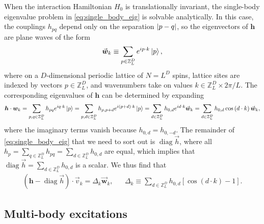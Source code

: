 \documentclass[nofootinbib,notitlepage,11pt]{revtex4-2}
\newcommand{\p}[1]{\left(#1\right)} %
\renewcommand{\sp}[1]{\left[#1\right]} %
\renewcommand{\c}{\cdot} %
\newcommand{\m}{\bm} %
\renewcommand{\v}{\vec} %
\newcommand{\1}{\mathds{1}}
\newcommand{\ZZ}{\mathbb{Z}}
\DeclareMathOperator{\diag}{diag}
\begin{document}
When the interaction Hamiltonian $H_0$ is translationally invariant,
the single-body eigenvalue problem in \eqref{eq:single_body_eig} is
solvable analytically.  In this case, the couplings $h_{pq}$ depend
only on the separation $\abs{p-q}$, so the eigenvectors of $\m h$ are
plane waves of the form
\begin{align}
  \v{\m w}_k \equiv \sum_{p\in\ZZ_L^D} e^{ip\c k} \ket{p},
\end{align}
where on a $D$-dimensional periodic lattice of $N=L^D$ spins, lattice
sites are indexed by vectors $p\in\ZZ_L^D$, and wavenumbers take on
values $k\in\ZZ_L^D\times2\pi/L$.  The corresponding eigenvalues of
$\m h$ can be determined by expanding
\begin{align}
  \m h\c{\m w}_k
  = \sum_{p,q\in\ZZ_L^D} h_{pq} e^{iq\c k} \ket{p}
  = \sum_{p,d\in\ZZ_L^D} h_{p,p+d} e^{i\p{p+d}\c k} \ket{p}
  = \sum_{d\in\ZZ_L^D} h_{0,d} e^{id\c k} \v{\m w}_k
  = \sum_{d\in\ZZ_L^D} h_{0,d} \cos\p{d\c k} \v{\m w}_k,
\end{align}
where the imaginary terms vanish because $h_{0,d}=h_{0,-d}$.  The
remainder of \eqref{eq:single_body_eig} that we need to sort out is
$\diag\v h$, where all
$h_p=\sum_{q\in\ZZ_L^D}h_{pq}=\sum_{d\in\ZZ_L^D}h_{0,d}$ are equal,
which implies that $\diag\v h=\sum_{d\in\ZZ_L^D}h_{0,d}$ is a scalar.
We thus find that
\begin{align}
  \p{\m h - \diag\v h}\c\v v_k = \Delta_k \v{\m w}_k,
  &&
  \Delta_k \equiv \sum_{d\in\ZZ_L^D} h_{0,d} \sp{\cos\p{d\c k}-1}.
\end{align}

\subsection{Multi-body excitations}
\label{sec:multi_body_eigenstates}
\end{document}
